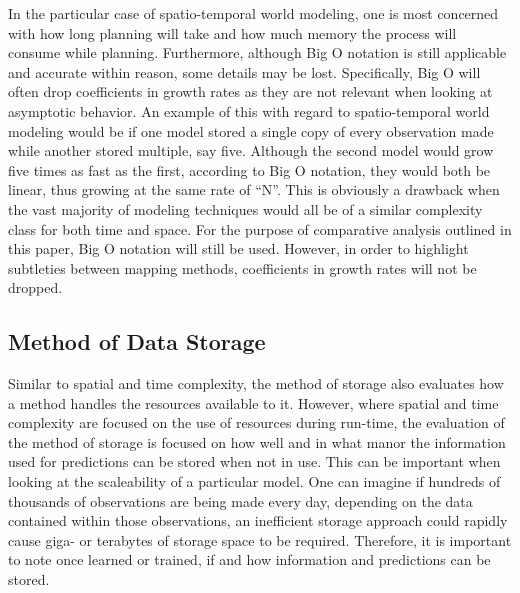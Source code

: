   In the particular case of spatio-temporal world modeling, one is most
  concerned with how long planning will take and how much memory the
  process will consume while planning. Furthermore, although Big O notation is
  still applicable and accurate within reason, some details may be lost.
  Specifically, Big O will often drop coefficients in growth rates as they are
  not relevant when looking at asymptotic behavior. An example of this with
  regard to spatio-temporal world modeling would be if one model stored a
  single copy of every observation made while another stored multiple, say
  five. Although the second model would grow five times as fast as the first,
  according to Big O notation, they would both be linear, thus growing at the
  same rate of ``N''. This is obviously a drawback when the vast majority of
  modeling techniques would all be of a similar complexity class for both time
  and space. For the purpose of comparative analysis outlined in this paper, Big O
  notation will still be used. However, in order to
  highlight subtleties between mapping methods, coefficients in
  growth rates will not be dropped. \\


  \subsection{ Method of Data Storage }
  Similar to spatial and time complexity, the method of storage also
  evaluates how a method handles the resources available to it. However, where
  spatial and time complexity are focused on the use of resources during
  run-time, the evaluation of the method of storage is focused on how well and in what manor
  the information used for predictions can be stored when not in use. This
  can be important when looking at the scaleability of a particular model. One
  can imagine if hundreds of thousands of observations are being made every
  day, depending on the data contained within those observations, an
  inefficient storage approach could rapidly cause giga- or terabytes of storage
  space to be required. Therefore, it is important to note once learned or trained,
  if and how information and predictions can be stored. \\

